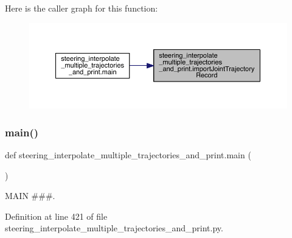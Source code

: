 Here is the caller graph for this function\+:\nopagebreak
\begin{figure}[H]
\begin{center}
\leavevmode
\includegraphics[width=350pt]{namespacesteering__interpolate__multiple__trajectories__and__print_a5ecaa1f0c7b7379d5d217b69ecbcfafc_icgraph}
\end{center}
\end{figure}
\mbox{\label{namespacesteering__interpolate__multiple__trajectories__and__print_a17184534fa48653e3e1957dd8fe17257}} 
\subsubsection{\texorpdfstring{main()}{main()}}
{\footnotesize\ttfamily def steering\+\_\+interpolate\+\_\+multiple\+\_\+trajectories\+\_\+and\+\_\+print.\+main (\begin{DoxyParamCaption}{ }\end{DoxyParamCaption})}



M\+A\+IN \#\#\#. 



Definition at line 421 of file steering\+\_\+interpolate\+\_\+multiple\+\_\+trajectories\+\_\+and\+\_\+print.\+py.


